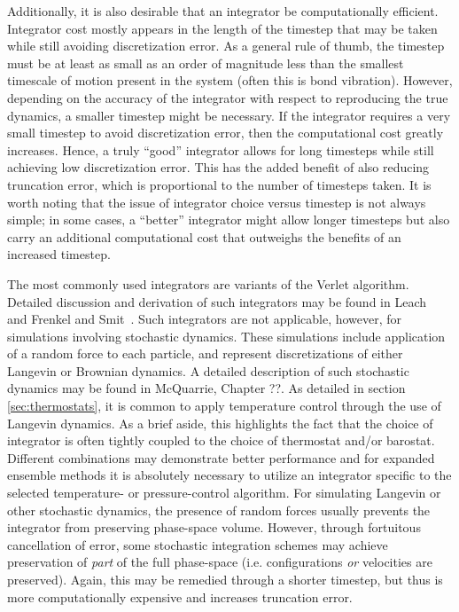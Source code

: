 \documentclass[9pt,bestpractices]{livecoms}
\begin{document}
Additionally, it is also desirable that an integrator be computationally efficient.
Integrator cost mostly appears in the length of the timestep that may be taken while still avoiding discretization error. 
As a general rule of thumb, the timestep must be at least as small as an order of magnitude less than the smallest timescale of motion present in the system (often this is bond vibration).
However, depending on the accuracy of the integrator with respect to reproducing the true dynamics, a smaller timestep might be necessary.
If the integrator requires a very small timestep to avoid discretization error, then the computational cost greatly increases.
Hence, a truly ``good'' integrator allows for long timesteps while still achieving low discretization error.
This has the added benefit of also reducing truncation error, which is proportional to the number of timesteps taken.
It is worth noting that the issue of integrator choice versus timestep is not always simple; in some cases, a ``better'' integrator might allow longer timesteps but also carry an additional computational cost that outweighs the benefits of an increased timestep.

The most commonly used integrators are variants of the Verlet algorithm. 
Detailed discussion and derivation of such integrators may be found in Leach~\cite{LeachBook} and Frenkel and Smit~\cite{Frenkel:2001:}.
Such integrators are not applicable, however, for simulations involving stochastic dynamics.
These simulations include application of a random force to each particle, and represent discretizations of either Langevin or Brownian dynamics.
A detailed description of such stochastic dynamics may be found in McQuarrie, Chapter ??.
As detailed in section \ref{sec:thermostats}, it is common to apply temperature control through the use of Langevin dynamics.
As a brief aside, this highlights the fact that the choice of integrator is often tightly coupled to the choice of thermostat and/or barostat.
Different combinations may demonstrate better performance and for expanded ensemble methods it is absolutely necessary to utilize an integrator specific to the selected temperature- or pressure-control algorithm.
For simulating Langevin or other stochastic dynamics, the presence of random forces usually prevents the integrator from preserving phase-space volume.
However, through fortuitous cancellation of error, some stochastic integration schemes may achieve preservation of \textit{part} of the full phase-space (i.e. configurations \textit{or} velocities are preserved).
Again, this may be remedied through a shorter timestep, but thus is more computationally expensive and increases truncation error.
\end{document}

